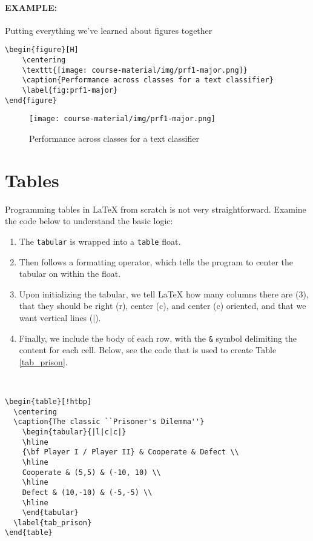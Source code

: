 \documentclass[11pt]{article}
\begin{document}
\paragraph{EXAMPLE:} Putting everything we've learned about figures together

\begin{lstlisting}
\begin{figure}[H]
    \centering
    \texttt{[image: course-material/img/prf1-major.png]}
    \caption{Performance across classes for a text classifier}
    \label{fig:prf1-major}
\end{figure}
\end{lstlisting}

\begin{figure}[H]
    \centering
    \texttt{[image: course-material/img/prf1-major.png]}
    \caption{Performance across classes for a text classifier}
    \label{fig:prf1-major}
\end{figure}

\section*{Tables}

Programming tables in {\LaTeX} from scratch is not very straightforward. Examine the code below to understand the basic logic:

\begin{enumerate}
    \item The \texttt{tabular} is wrapped into a \texttt{table} float.
    \item Then follows a formatting operator, which tells the program to center the tabular on within the float.
    \item Upon initializing the tabular, we tell {\LaTeX} how many columns there are (3), that they should be right (r), center (c), and center (c) oriented, and that we want vertical lines ($|$).
    \item Finally, we include the body of each row, with the \texttt{\&} symbol delimiting the content for each cell. Below, see the code that is used to create Table \ref{tab_prison}.
\end{enumerate}\\\vspace{1.5em}
\begin{lstlisting}
\begin{table}[!htbp]
  \centering
  \caption{The classic ``Prisoner's Dilemma''}
    \begin{tabular}{|l|c|c|}
    \hline
    {\bf Player I / Player II} & Cooperate & Defect \\
    \hline
    Cooperate & (5,5) & (-10, 10) \\
    \hline
    Defect & (10,-10) & (-5,-5) \\
    \hline
    \end{tabular}
  \label{tab_prison}
\end{table}
\end{lstlisting}
\end{document}

